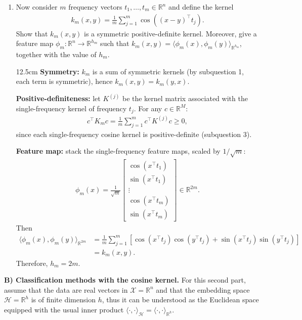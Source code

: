 \begin{enumerate}
\begin{solutionbox}{8cm}
    \end{solutionbox}
    \newpage
    \item Now consider $m$ frequency vectors $t_1, \ldots, t_m \in \mathbb{R}^n$ and define the kernel
    \begin{align*}
    k_m(x,y) = \frac{1}{m} \sum_{j=1}^m \cos((x-y)^\top t_j).
    \end{align*}
    Show that $k_m(x,y)$ is a symmetric positive-definite kernel. Moreover, give a feature map $\phi_m : \mathbb{R}^n \to \mathbb{R}^{h_m}$ such that $k_m(x,y) = \langle \phi_m(x),\phi_m(y) \rangle_{\mathbb{R}^{h_m}}$, together with the value of $h_m$.
    \begin{solutionbox}{12.5cm}
    \textbf{Symmetry:} $k_m$ is a sum of symmetric kernels (by subquestion 1, each term is symmetric), hence $k_m(x,y) = k_m(y,x)$.

    \textbf{Positive-definiteness:} let $K^{(j)}$ be the kernel matrix associated with the single-frequency kernel of frequency $t_j$. For any $c \in \mathbb{R}^M$:
    \begin{align*}
    c^\top K_m c = \frac{1}{m} \sum_{j=1}^m c^\top K^{(j)} c \geq 0,
    \end{align*}
    since each single-frequency cosine kernel is positive-definite (subquestion 3).

    \textbf{Feature map:} stack the single-frequency feature maps, scaled by $1/\sqrt{m}$:
    \begin{align*}
    \phi_m(x) = \frac{1}{\sqrt{m}} \begin{bmatrix} \cos(x^\top t_1) \\ \sin(x^\top t_1) \\ \vdots \\ \cos(x^\top t_m) \\ \sin(x^\top t_m) \end{bmatrix} \in \mathbb{R}^{2m}.
    \end{align*}
    Then
    \begin{align*}
    \langle \phi_m(x), \phi_m(y) \rangle_{\mathbb{R}^{2m}} &= \frac{1}{m} \sum_{j=1}^m \left[\cos(x^\top t_j)\cos(y^\top t_j) + \sin(x^\top t_j)\sin(y^\top t_j)\right] \\
    &= k_m(x,y).
    \end{align*}
    Therefore, $h_m = 2m$.
    \end{solutionbox}
\end{enumerate}

\newpage
\textbf{B) Classification methods with the cosine kernel.}
For this second part, assume that the data are real vectors in $\mathcal{X} = \mathbb{R}^n$ and that the embedding space $\mathcal{H}= \mathbb{R}^h$ is of finite dimension $h$, thus it can be understood as the Euclidean space equipped with the usual inner product $\langle \cdot , \cdot \rangle_{\mathcal{H}} = \langle \cdot , \cdot \rangle_{\mathbb{R}^h} $.

